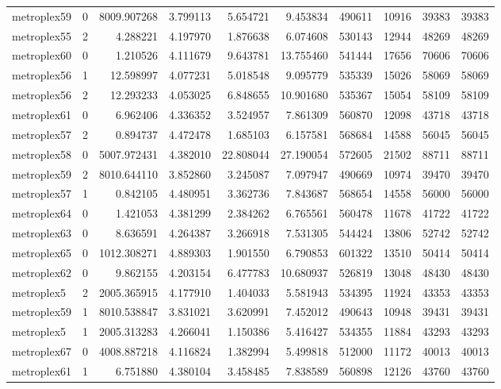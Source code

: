 \documentclass[../../../thesis.tex]{subfiles}
\begin{document}
\begin{longtable}{|l|r|r|r|r|r|r|r|r|r|}
metroplex59 & 0 & 8009.907268 & 3.799113 & 5.654721 & 9.453834 & 490611 & 10916 & 39383 & 39383 \\
metroplex55 & 2 & 4.288221 & 4.197970 & 1.876638 & 6.074608 & 530143 & 12944 & 48269 & 48269 \\
metroplex60 & 0 & 1.210526 & 4.111679 & 9.643781 & 13.755460 & 541444 & 17656 & 70606 & 70606 \\
metroplex56 & 1 & 12.598997 & 4.077231 & 5.018548 & 9.095779 & 535339 & 15026 & 58069 & 58069 \\
metroplex56 & 2 & 12.293233 & 4.053025 & 6.848655 & 10.901680 & 535367 & 15054 & 58109 & 58109 \\
metroplex61 & 0 & 6.962406 & 4.336352 & 3.524957 & 7.861309 & 560870 & 12098 & 43718 & 43718 \\
metroplex57 & 2 & 0.894737 & 4.472478 & 1.685103 & 6.157581 & 568684 & 14588 & 56045 & 56045 \\
metroplex58 & 0 & 5007.972431 & 4.382010 & 22.808044 & 27.190054 & 572605 & 21502 & 88711 & 88711 \\
metroplex59 & 2 & 8010.644110 & 3.852860 & 3.245087 & 7.097947 & 490669 & 10974 & 39470 & 39470 \\
metroplex57 & 1 & 0.842105 & 4.480951 & 3.362736 & 7.843687 & 568654 & 14558 & 56000 & 56000 \\
metroplex64 & 0 & 1.421053 & 4.381299 & 2.384262 & 6.765561 & 560478 & 11678 & 41722 & 41722 \\
metroplex63 & 0 & 8.636591 & 4.264387 & 3.266918 & 7.531305 & 544424 & 13806 & 52742 & 52742 \\
metroplex65 & 0 & 1012.308271 & 4.889303 & 1.901550 & 6.790853 & 601322 & 13510 & 50414 & 50414 \\
metroplex62 & 0 & 9.862155 & 4.203154 & 6.477783 & 10.680937 & 526819 & 13048 & 48430 & 48430 \\
metroplex5 & 2 & 2005.365915 & 4.177910 & 1.404033 & 5.581943 & 534395 & 11924 & 43353 & 43353 \\
metroplex59 & 1 & 8010.538847 & 3.831021 & 3.620991 & 7.452012 & 490643 & 10948 & 39431 & 39431 \\
metroplex5 & 1 & 2005.313283 & 4.266041 & 1.150386 & 5.416427 & 534355 & 11884 & 43293 & 43293 \\
metroplex67 & 0 & 4008.887218 & 4.116824 & 1.382994 & 5.499818 & 512000 & 11172 & 40013 & 40013 \\
metroplex61 & 1 & 6.751880 & 4.380104 & 3.458485 & 7.838589 & 560898 & 12126 & 43760 & 43760 \\

\end{longtable}
\end{document}
